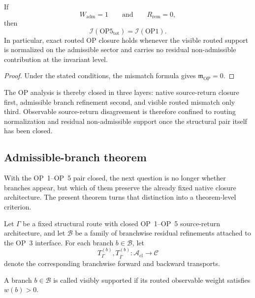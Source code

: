 \begin{corollary}
If
\[
W_{\mathrm{adm}}=1
\qquad\text{and}\qquad
R_{\mathrm{rem}}=0,
\]
then
\[
\mathcal{I}(\mathrm{OP5}_{\mathrm{tot}})=\mathcal{I}(\mathrm{OP1}).
\]
In particular, exact routed OP closure holds whenever the visible routed support is normalized on the admissible sector and carries no residual non-admissible contribution at the invariant level.
\end{corollary}

\begin{proof}
Under the stated conditions, the mismatch formula gives $\mathfrak{m}_{\mathrm{OP}}=0$.
\end{proof}

\begin{remark}
The OP analysis is thereby closed in three layers: native source-return closure first, admissible branch refinement second, and visible routed mismatch only third. Observable source-return disagreement is therefore confined to routing normalization and residual non-admissible support once the structural pair itself has been closed.
\end{remark}



\subsection{Admissible-branch theorem}
\label{sec:admissible-branch-theorem}

With the OP~1--OP~5 pair closed, the next question is no longer whether branches appear, but which of them preserve the already fixed native closure architecture. The present theorem turns that distinction into a theorem-level criterion.

Let $\Gamma$ be a fixed structural route with closed OP~1--OP~5 source-return architecture, and let $\mathcal{B}$ be a family of branchwise residual refinements attached to the OP~3 interface. For each branch $b\in\mathcal{B}$, let
\[
T_{\Gamma}^{(b)},T_{\overline{\Gamma}}^{(b)}:\mathcal{A}_{\mathrm{cl}}\to\mathcal{C}
\]
denote the corresponding branchwise forward and backward transports.

\begin{definition}
A branch $b\in\mathcal{B}$ is called visibly supported if its routed observable weight satisfies $w(b)>0$.
\end{definition}


